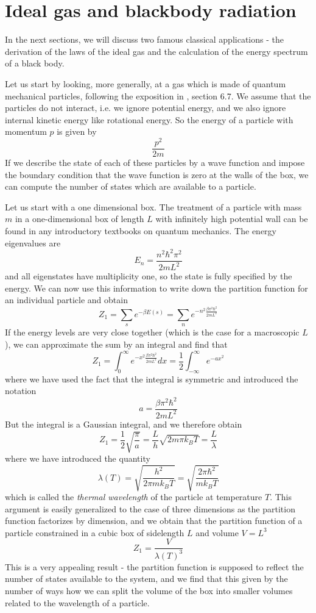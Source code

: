 \documentclass[a4paper, draft]{article}
\theoremstyle{own}
\theoremstyle{remark}
\begin{document}
\section{Ideal gas and blackbody radiation}

In the next sections, we will discuss two famous classical applications - the derivation of the laws of the ideal gas and the calculation of the energy spectrum of a black body.

Let us start by looking, more generally, at a gas which is made of quantum mechanical particles, following the exposition in \cite{Schroeder}, section 6.7.  We assume that the particles do not interact, i.e. we ignore potential energy, and we also ignore internal kinetic energy like rotational energy. So the energy of a particle with momentum $p$ is given by
$$
\frac{p^2}{2m}
$$
If we describe the state of each of these particles by a wave function and impose the boundary condition that the wave function is zero at the walls of the box, we can compute the number of states which are available to a particle. 

Let us start with a one dimensional box. The treatment of a particle with mass $m$ in a one-dimensional box of length $L$ with infinitely high potential wall can be found in any introductory textbooks on quantum mechanics. The energy eigenvalues are
$$
E_n = \frac{n^2 \hbar^2 \pi^2}{2m L^2}
$$
and all eigenstates have multiplicity one, so the state is fully specified by the energy. 
We can now use this information to write down the partition function for an individual particle and obtain
$$
Z_1 = \sum_s e^{-\beta E(s)} = \sum_n e^{- n^2 \frac{\beta \pi^2 \hbar^2}{2mL^2}} 
$$
If the energy levels are very close together (which is the case for a macroscopic $L$), we can approximate the sum by an integral and find that
$$
Z_1 = \int_0^\infty e^{-x^2 \frac{\beta \pi^2 \hbar^2}{2mL^2}} dx = 
\frac{1}{2}  \int_{-\infty}^\infty e^{-ax^2}
$$
where we have used the fact that the integral is symmetric and introduced the notation
$$
a = \frac{\beta \pi^2 \hbar^2}{2mL^2}
$$
But the integral is a Gaussian integral, and we therefore obtain
$$
Z_1 = \frac{1}{2} \sqrt{\frac{\pi}{a}} = \frac{L}{h} \sqrt{2m\pi k_B T} = \frac{L}{\lambda}
$$
where we have introduced the quantity 
$$
\lambda(T) = \sqrt{\frac{h^2}{2\pi m k_B T}} = \sqrt{\frac{2\pi \hbar^2}{m k_B T}}
$$
which is called the {\em thermal wavelength} of the particle at temperature $T$. This argument is easily generalized to the case of three dimensions as the partition function factorizes by dimension, and we obtain that the partition function of a particle constrained in a cubic box of sidelength $L$ and volume $V = L^3$
$$
Z_1 = \frac{V} {\lambda(T)^3}
$$
This is a very appealing result - the partition function is supposed to reflect the number of states available to the system, and we find that this given by the number of ways how we can split the volume of the box into smaller volumes related to the wavelength of a particle.
\end{document}
